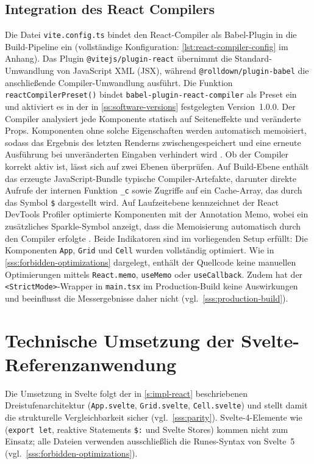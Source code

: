 \subsection{Integration des React Compilers}
\label{ss:impl-react-compiler}

Die Datei \texttt{vite.config.ts} bindet den React-Compiler als Babel-Plugin in die Build-Pipeline ein (vollständige Konfiguration: \cref{lst:react-compiler-config} im Anhang). Das Plugin \texttt{@vitejs/plugin-react} übernimmt die Standard-Umwandlung von JavaScript XML (JSX), während \texttt{@rolldown/plugin-babel} die anschließende Compiler-Umwandlung ausführt. Die Funktion \texttt{reactCompilerPreset()} bindet \texttt{babel-plugin-react-compiler} als Preset ein und aktiviert es in der in \cref{ss:software-versions} festgelegten Version~1.0.0. Der Compiler analysiert jede Komponente statisch auf Seiteneffekte und veränderte Props. Komponenten ohne solche Eigenschaften werden automatisch memoisiert, sodass das Ergebnis des letzten Renderns zwischengespeichert und eine erneute Ausführung bei unveränderten Eingaben verhindert wird \cite{react_compiler_2025}. Ob der Compiler korrekt aktiv ist, lässt sich auf zwei Ebenen überprüfen. Auf Build-Ebene enthält das erzeugte JavaScript-Bundle typische Compiler-Artefakte, darunter direkte Aufrufe der internen Funktion \texttt{\_c} sowie Zugriffe auf ein Cache-Array, das durch das Symbol \texttt{\$} dargestellt wird. Auf Laufzeitebene kennzeichnet der React DevTools Profiler optimierte Komponenten mit der Annotation \guillemotleft{}Memo\guillemotright{}, wobei ein zusätzliches Sparkle-Symbol anzeigt, dass die Memoisierung automatisch durch den Compiler erfolgte \cite{gsathya-compiler-2024}. Beide Indikatoren sind im vorliegenden Setup erfüllt: Die Komponenten \texttt{App}, \texttt{Grid} und \texttt{Cell} wurden vollständig optimiert. Wie in \cref{sss:forbidden-optimizations} dargelegt, enthält der Quellcode keine manuellen Optimierungen mittels \texttt{React.memo}, \texttt{useMemo} oder \texttt{useCallback}. Zudem hat der \texttt{<StrictMode>}-Wrapper in \texttt{main.tsx} im Production-Build keine Auswirkungen und beeinflusst die Messergebnisse daher nicht (vgl.~\cref{sss:production-build}).

\section{Technische Umsetzung der Svelte-Referenzanwendung}
\label{s:impl-svelte}

Die Umsetzung in Svelte folgt der in \cref{s:impl-react} beschriebenen Dreistufenarchitektur (\texttt{App.svelte}, \texttt{Grid.svelte}, \texttt{Cell.svelte}) und stellt damit die strukturelle Vergleichbarkeit sicher (vgl.~\cref{sss:parity}). Svelte-4-Elemente wie (\texttt{export let}, reaktive Statements \texttt{\$:} und Svelte Stores) kommen nicht zum Einsatz; alle Dateien verwenden ausschließlich die Runes-Syntax von Svelte~5 (vgl.~\cref{sss:forbidden-optimizations}).

